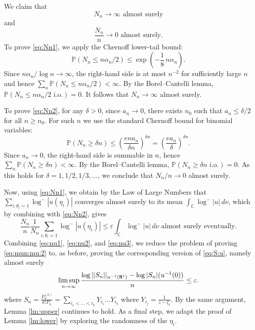 \documentclass[12pt, reqno]{amsart}
\theoremstyle{plain}
\theoremstyle{definition}
\newcommand\C{{\mathbb{C}}}
\renewcommand\P{{\mathbb{P}}}
\newcommand{\ep}{\varepsilon}
\begin{document}
 
 We claim that
 \begin{equation}
 	N_n\to \infty \text{ almost surely}\label{eq:Nn1}
 \end{equation}
 and
 \begin{equation}
 	\frac{N_n}{n}\to 0 \text{ almost surely}\label{eq:Nn2}.
 \end{equation}
 To prove \eqref{eq:Nn1}, we apply the Chernoff lower-tail bound:  
 \[
 \P (N_n \le n \alpha_n/2 )\le \exp\!\left(- \frac18\,n \alpha_n\right).
 \]
 Since $n \alpha_n /\log n\to \infty$, the right-hand side is at most $n^{-2}$ for sufficiently large $n$ and hence $\sum_n \P(N_n \le n\alpha_n/2) < \infty$. By the Borel--Cantelli lemma,
 $\P(N_n \le n\alpha_n/2 \text{ i.o.}) = 0$. It follows that $N_n \to \infty$ almost surely.
 
 To prove \eqref{eq:Nn2}, for any $\delta > 0$, since $a_n \to 0$, there exists $n_0$ such that
 $a_n \le \delta/2$ for all $n \ge n_0$. For such $n$ we use the standard
 Chernoff bound for binomial variables:
 \[
 \P(N_n \ge \delta n)
 \le \left( \frac{e n a_n}{\delta n} \right)^{\delta n}
 = \left( \frac{e a_n}{\delta} \right)^{\delta n}.
 \]
 Since $a_n \to 0$, the right-hand side is summable in $n$, hence
 $\sum_{n} \P(N_n \ge \delta n) < \infty$. By the Borel--Cantelli lemma,
 $\P(N_n \ge \delta n \text{ i.o.}) = 0$. As this holds for
 $\delta = 1, 1/2, 1/3, \dots$, we conclude that $N_n/n \to 0$ almost surely.
 
 Now, using \eqref{eq:Nn1}, we obtain by the Law of Large Numbers that $\sum_{i: \theta_i=1} \log^-|u(\eta_i)|$ converges almost surely to its mean $ \int_{\C} \log^- |u|\, d\nu$, which by combining with \eqref{eq:Nn2}, gives
 \begin{equation}
 	\frac{N_n}{n}\frac{1}{N_n}\sum_{i: \theta_i=1} \log^-|u(\eta_i)|\le \ep \int_{\C} \log^- |u|\, d\nu \text{ \ almost surely eventually}.\label{eq:nu3}
 \end{equation}
 Combining \eqref{eq:nu1}, \eqref{eq:nu2}, and \eqref{eq:nu3}, we reduce the problem of proving \eqref{eq:mun:mu:2} to, as before, proving the corresponding version of \eqref{eq:S:u}, namely almost surely
 \begin{equation}
 	\limsup_{n\to \infty} \frac{\log||S_n||_{u^{-1}(\mathbf S^1)} - \log |S_n|(u^{-1}(0))}{n}\le \ep.\notag
 \end{equation}
 where
 $S_n = \frac{P_n^{(k)}}{k!P_n} = \sum_{i_1<\dots<i_k} Y_{i_1}\dots Y_{i_k}$ where $Y_{i_j} = \frac{1}{z - \xi_i}$. By the same argument, Lemma \ref{lm:upper} continues to hold. As a final step, we adapt the proof of Lemma \ref{lm:lower} by exploring the randomness of the $\eta_i$. 
 
\end{document}

